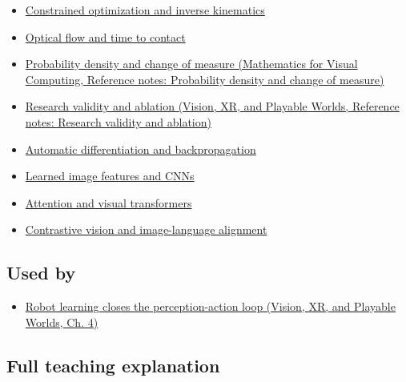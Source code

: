 \hypertarget{appendix-b0c42da325f1-prerequisites}{}

\begin{itemize}
\tightlist
\item
  \hyperref[appendix-29f4bea4c2bb]{Constrained optimization and inverse kinematics}
\item
  \hyperref[appendix-e2e73f8cd93e]{Optical flow and time to contact}
\item
  \href{../02-Mathematics-for-Visual-Computing/main.pdf\#nameddest=appendix-4815cd87ab8b}{Probability density and change of measure (Mathematics for Visual Computing, Reference notes: Probability density and change of measure)}
\item
  \href{../07-Vision-XR-and-Playable-Worlds/main.pdf\#nameddest=appendix-65788587ef78}{Research validity and ablation (Vision, XR, and Playable Worlds, Reference notes: Research validity and ablation)}
\item
  \hyperref[appendix-40df0855b4a7]{Automatic differentiation and backpropagation}
\item
  \hyperref[appendix-47c51ea026fb]{Learned image features and CNNs}
\item
  \hyperref[appendix-a9d5dfdd164a]{Attention and visual transformers}
\item
  \hyperref[appendix-772f1fd96148]{Contrastive vision and image-language alignment}
\end{itemize}

\subsection{Used by}\label{appendix-b0c42da325f1-used-by}

\hypertarget{appendix-b0c42da325f1-used-by}{}

\begin{itemize}
\tightlist
\item
  \href{../07-Vision-XR-and-Playable-Worlds/main.pdf\#nameddest=04-visual-computing-ii-ch034-robot-learning-closes-the-perception-action-loop}{Robot learning closes the perception-action loop (Vision, XR, and Playable Worlds, Ch. 4)}
\end{itemize}

\subsection{Full teaching explanation}\label{appendix-b0c42da325f1-full-teaching-explanation}

\hypertarget{appendix-b0c42da325f1-full-teaching-explanation}{}


